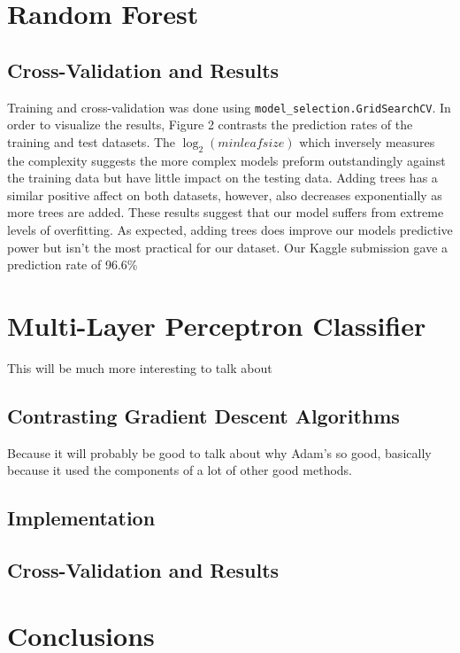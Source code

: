 \documentclass{article}
\begin{document}
\section{Random Forest}

\subsection{Cross-Validation and Results}
Training and cross-validation was done using \verb+model_selection.GridSearchCV+. In order to visualize the results, Figure 2 contrasts the prediction rates of the training and test datasets. The $\log_2(minleafsize)$ which inversely measures the complexity suggests the more complex models preform outstandingly against the training data but have little impact on the testing data. Adding trees has a similar positive affect on both datasets, however, also decreases exponentially as more trees are added. These results suggest that our model suffers from extreme levels of overfitting. As expected, adding trees does improve our models predictive power but isn't the most practical for our dataset. Our Kaggle submission gave a prediction rate of 96.6\%

\section{Multi-Layer Perceptron Classifier}
This will be much more interesting to talk about

\subsection{Contrasting Gradient Descent Algorithms}
Because it will probably be good to talk about why Adam's so good, basically because it used the components of a lot of other good methods.

\subsection{Implementation}

\subsection{Cross-Validation and Results}

\section{Conclusions}
\end{document}
